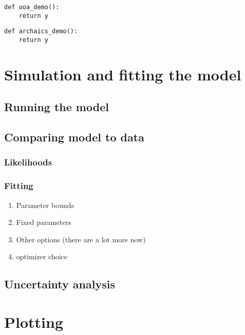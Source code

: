 \documentclass[11pt]{article}
\begin{document}
\begin{lstlisting}[caption={\textbf{Out of Africa Demography:}}, float, label={lst:IM}]
def ooa_demo():
    return y
\end{lstlisting}

\begin{lstlisting}[caption={\textbf{Archaic Hominin Demography:}}, float, label={lst:IM}]
def archaics_demo():
    return y
\end{lstlisting}


\clearpage

\section{Simulation and fitting the model}

\subsection{Running the model}

\subsection{Comparing model to data}

\subsubsection{Likelihoods}


\subsubsection{Fitting}

\begin{enumerate}
\item Parameter bounds
\item Fixed parameters
\item Other options (there are a lot more now)
\item optimizer choice
\end{enumerate}

\subsection{Uncertainty analysis}


\section{Plotting}
\end{document}
